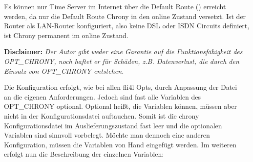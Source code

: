 Es können nur Time Server im Internet über die Default Route ()
erreicht werden, da nur die Default Route Chrony in den online Zustand
versetzt. Ist der Router als LAN-Router konfiguriert, also keine DSL oder
ISDN Circuits definiert, ist Chrony permanent im online Zustand.

\textbf{Disclaimer: }\emph{Der Autor gibt weder eine Garantie auf die
Funktionsfähigkeit des OPT\_\-CHRONY, noch haftet er für Schäden, z.B.
Datenverlust, die durch den Einsatz von OPT\_\-CHRONY entstehen.}



Die Konfiguration erfolgt, wie bei allen fli4l Opts, durch Anpassung der Datei\\
 an die eigenen Anforderungen.
Jedoch sind fast alle Variablen des OPT\_\-CHRONY optional. Optional heißt, die
Variablen können, müssen aber nicht in der Konfigurationsdatei auftauchen.
Somit ist die chrony Konfigurationsdatei im Auslieferungszustand fast leer und
die optionalen Variablen sind sinnvoll vorbelegt. Möchte man dennoch eine
anderen Konfiguration, müssen die Variablen von Hand eingefügt werden. Im
weiteren erfolgt nun die Beschreibung der einzelnen Variablen: 


